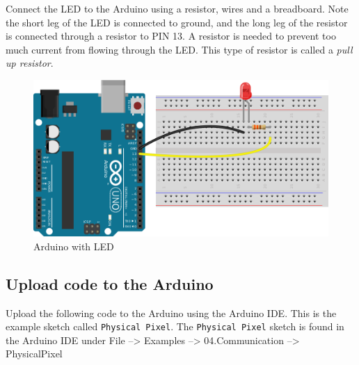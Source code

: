 \documentclass{book}
\makeatletter
\def\maxwidth{\ifdim\Gin@nat@width>\linewidth\linewidth
    \else\Gin@nat@width\fi}
\let\Oldincludegraphics\includegraphics
\renewcommand{\includegraphics}[1]{\Oldincludegraphics[width=.8\maxwidth]{#1}}
\makeatother
\begin{document}
    
        Connect the LED to the Arduino using a resistor, wires and a breadboard.
Note the short leg of the LED is connected to ground, and the long leg
of the resistor is connected through a resistor to PIN 13. A resistor is
needed to prevent too much current from flowing through the LED. This
type of resistor is called a \emph{pull up resistor}.
    




    
        \begin{figure}
\centering
\includegraphics{images/arduino_LED.png}
\caption{Arduino with LED}
\end{figure}
    




    
        \subsection{Upload code to the
Arduino}\label{upload-code-to-the-arduino}
    




    
        Upload the following code to the Arduino using the Arduino IDE. This is
the example sketch called \lstinline!Physical Pixel!. The
\lstinline!Physical Pixel! sketch is found in the Arduino IDE under File
--\textgreater{} Examples --\textgreater{} 04.Communication
--\textgreater{} PhysicalPixel
\end{document}
